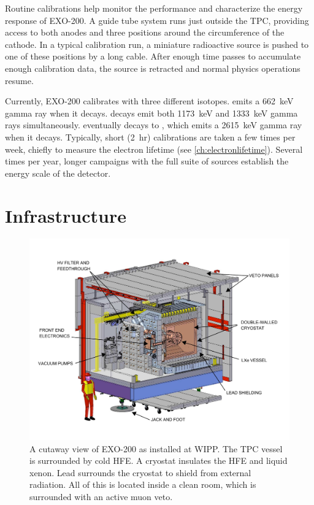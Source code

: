 \documentclass[herrin-thesis.tex]{subfiles}
\begin{document}
Routine calibrations help monitor the performance and characterize the energy response of EXO-200. A guide tube system runs just outside the TPC, providing access to both anodes and three positions around the circumference of the cathode. In a typical calibration run, a miniature radioactive source is pushed to one of these positions by a long cable. After enough time passes to accumulate enough calibration data, the source is retracted and normal physics operations resume.

Currently, EXO-200 calibrates with three different isotopes.  emits a \SI{662}{\keV} gamma ray when it decays.  decays emit both \SI{1173}{\keV} and \SI{1333}{\keV} gamma rays simultaneously.  eventually decays to , which emits a \SI{2615}{\keV} gamma ray when it decays. Typically, short (\SI{2}{hr})  calibrations are taken a few times per week, chiefly to measure the electron lifetime (see \cref{ch:electronlifetime}). Several times per year, longer campaigns with the full suite of sources establish the energy scale of the detector.

\section{Infrastructure}

\begin{figure}
\centering
\includegraphics[width=1.0\textwidth]{./photos/detector_cleanroom.pdf}
\caption[Cutaway view of EXO-200 as installed]{A cutaway view of EXO-200 as installed at WIPP. The TPC vessel is surrounded by cold HFE. A cryostat insulates the HFE and liquid xenon. Lead surrounds the cryostat to shield from external radiation. All of this is located inside a clean room, which is surrounded with an active muon veto.}
\label{fig:detector_cleanroom}
\end{figure}
\end{document}
